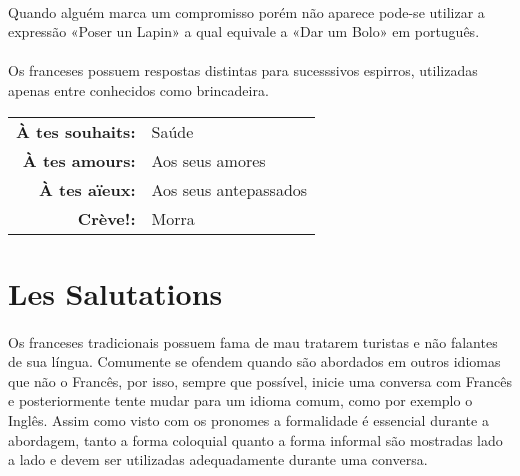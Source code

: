 \documentclass{article}
\begin{document}
        \paragraph{}Quando alguém marca um compromisso porém não aparece pode-se utilizar a expressão «Poser un Lapin» a qual equivale a «Dar um Bolo» em português.
        
        \paragraph{}Os franceses possuem respostas distintas para sucesssivos espirros, utilizadas apenas entre conhecidos como brincadeira.

            \begin{center}
                \begin{tabular}{rl}
                    \textbf{À tes souhaits:} & Saúde\\
                    \textbf{À tes amours:}   & Aos seus amores\\
                    \textbf{À tes aïeux:}    & Aos seus antepassados\\
                    \textbf{Crève!:}         & Morra\\
                \end{tabular}
            \end{center}
\newpage

\section{Les Salutations}
    \paragraph{}Os franceses tradicionais possuem fama de mau tratarem turistas e não falantes de sua língua. Comumente se ofendem quando são abordados em outros idiomas que não o Francês, por isso, sempre que possível, inicie uma conversa com Francês e posteriormente tente mudar para um idioma comum, como por exemplo o Inglês. Assim como visto com os pronomes a formalidade é essencial durante a abordagem, tanto a forma coloquial quanto a forma informal são mostradas lado a lado e devem ser utilizadas adequadamente durante uma conversa. 
\end{document}

